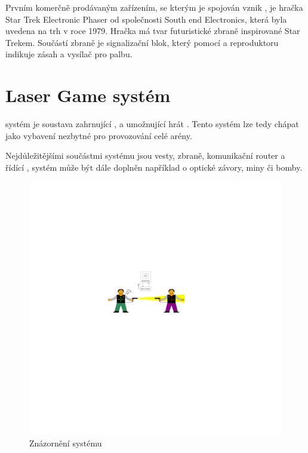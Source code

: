 Prvním komerčně prodávaným zařízením, se kterým je spojován vznik , je hračka Star Trek Electronic Phaser od společnosti South end Electronics, která byla uvedena na trh v roce 1979. Hračka má tvar futuristické zbraně inspirované Star Trekem. Součástí zbraně je signalizační blok, který pomocí  a reproduktoru indikuje zásah a  vysílač pro palbu.

\section{Laser Game systém}
 systém je soustava zahrnující ,  a  umožnující hrát . Tento systém lze tedy chápat jako vybavení nezbytné pro provozování celé arény.

Nejdůležitějšími součástmi  systému jsou vesty, zbraně, komunikační router a řídící ,  systém může být dále doplněn například o optické závory, miny či bomby.

\begin{figure}[H]
    \begin{center}
        \includegraphics[width=\textwidth]{img/lgs}
    \end{center}
    \caption{Znázornění  systému}
\end{figure}

